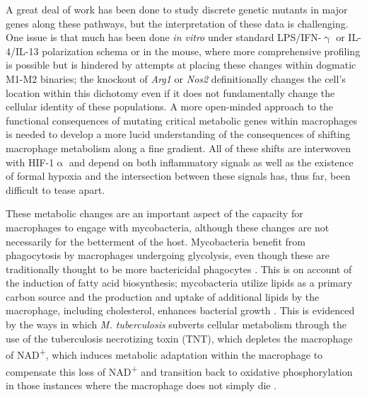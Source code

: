 A great deal of work has been done to study discrete genetic mutants in major genes along these pathways, but the interpretation of these data is challenging. One issue is that much has been done \textit{in vitro} under standard LPS/IFN\hyp{}$\upgamma$ or IL\hyp{}4/IL\hyp{}13 polarization schema or in the mouse, where more comprehensive profiling is possible but is hindered by attempts at placing these changes within dogmatic M1\hyp{}M2 binaries; the knockout of \textit{Arg1} or \textit{Nos2} definitionally changes the cell's location within this dichotomy even if it does not fundamentally change the cellular identity of these populations. A more open\hyp{}minded approach to the functional consequences of mutating critical metabolic genes within macrophages is needed to develop a more lucid understanding of the consequences of shifting macrophage metabolism along a fine gradient. All of these shifts are interwoven with HIF\hyp{}1$\upalpha$ and depend on both inflammatory signals as well as the existence of formal hypoxia and the intersection between these signals has, thus far, been difficult to tease apart.

These metabolic changes are an important aspect of the capacity for macrophages to engage with mycobacteria, although these changes are not necessarily for the betterment of the host. Mycobacteria benefit from phagocytosis by macrophages undergoing glycolysis, even though these are traditionally thought to be more bactericidal phagocytes \citep{Escoll2019, Mehrotra2014, Shi2019}. This is on account of the induction of fatty acid biosynthesis; mycobacteria utilize lipids as a primary carbon source and the production and uptake of additional lipids by the macrophage, including cholesterol, enhances bacterial growth \citep{Gatfield2000, Nazarova2019, Yan2020}. This is evidenced by the ways in which \textit{M. tuberculosis} subverts cellular metabolism through the use of the tuberculosis necrotizing toxin (TNT), which depletes the macrophage of NAD\textsuperscript{+}, which induces metabolic adaptation within the macrophage to compensate this loss of NAD\textsuperscript{+} and transition back to oxidative phosphorylation in those instances where the macrophage does not simply die \citep{Howard2020}. 

